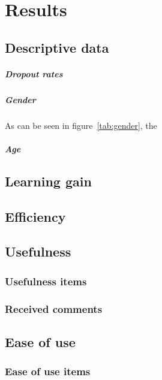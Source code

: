 \chapter{Results}
\label{ch:results}

\section{Descriptive data}

\paragraph{Dropout rates} 

\paragraph{Gender} As can be seen in figure~\ref{tab:gender}, the 

\paragraph{Age}

\section{Learning gain}

\section{Efficiency}

\section{Usefulness}

\subsection{Usefulness items}

\subsection{Received comments}

\section{Ease of use}

\subsection{Ease of use items}

